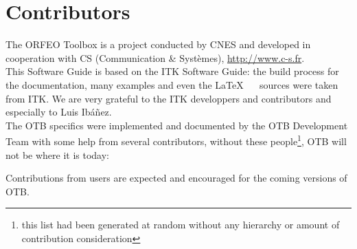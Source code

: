 \chapter{Contributors}
\noindent

The ORFEO Toolbox is a project conducted by CNES and developed in
cooperation with CS (Communication \& Syst\`{e}mes), \url{http://www.c-s.fr}.\\

This Software Guide is based on the ITK Software Guide: the build
process for the documentation, many examples and even the \LaTeX~ ~
sources were taken from ITK. We are very grateful to the ITK
developpers and contributors and especially to Luis Ib\'a\~nez.\\

The OTB specifics were implemented and documented by the OTB Development Team with some help from several contributors, without these people\footnote{this list had been generated at random without any hierarchy or amount of contribution consideration}, OTB will not be where it is today:



Contributions from users are expected and encouraged for the coming
versions of OTB.


